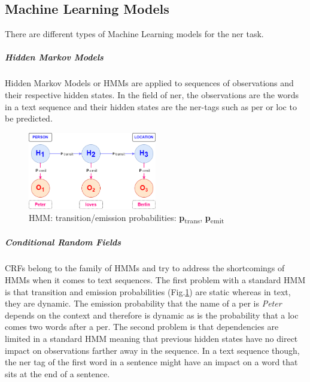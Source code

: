 \subsection{Machine Learning Models}\label{subsec:machine-learning-models}
There are different types of Machine Learning models for the \gls{ner} task.
\subparagraph{Hidden Markov Models}
Hidden Markov Models or \glspl{HMM} \cite{StanfordNLPNER} are applied to sequences of observations and their respective hidden states.
In the field of \gls{ner}, the observations are the words in a text sequence and their hidden states are
the \gls{ner}-tags such as \gls{per} or \gls{loc} to be predicted.

\begin{figure}[H]   %
    \centering
    \includegraphics[width=0.5\textwidth]{Assets/HMM}
    \caption{\gls{HMM}: transition/emission probabilities: \textbf{p}\textsubscript{trans}, \textbf{p}\textsubscript{emit}}
    \label{fig:HMM}
\end{figure}

\subparagraph{Conditional Random Fields}
\glspl{CRF} \cite{StanfordNLPNER} belong to the family of \glspl{HMM} and try to address the shortcomings of \glspl{HMM} when it comes to text sequences.
The first problem with a standard \gls{HMM} is that transition and emission probabilities (Fig.\ref{fig:HMM}) are static whereas in text, they are dynamic.
The emission probability that the name of a \gls{per} is \textit{Peter} depends on the context and therefore is dynamic as is the probability that a \gls{loc} comes two words after a \gls{per}.
The second problem is that dependencies are limited in a standard \gls{HMM} meaning that previous hidden states have no direct impact on observations farther away in the sequence.
In a text sequence though, the \gls{ner} tag of the first word in a sentence might have an impact on a word that sits at the end of a sentence.

